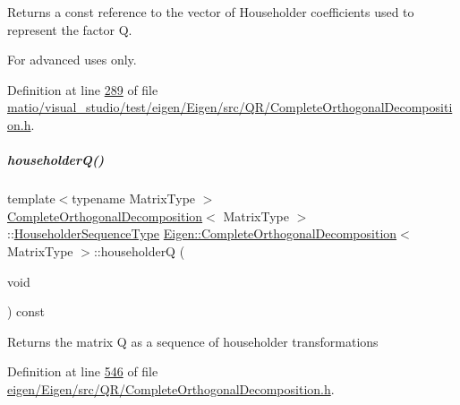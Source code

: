 \begin{DoxyReturn}{Returns}
a const reference to the vector of Householder coefficients used to represent the factor {\ttfamily Q}.
\end{DoxyReturn}
For advanced uses only. 

Definition at line \hyperlink{matio_2visual__studio_2test_2eigen_2_eigen_2src_2_q_r_2_complete_orthogonal_decomposition_8h_source_l00289}{289} of file \hyperlink{matio_2visual__studio_2test_2eigen_2_eigen_2src_2_q_r_2_complete_orthogonal_decomposition_8h_source}{matio/visual\+\_\+studio/test/eigen/\+Eigen/src/\+Q\+R/\+Complete\+Orthogonal\+Decomposition.\+h}.

\mbox{\label{group___q_r___module_ac95b93ddad59c6e57d06fcd4737b27e1}} 
\subparagraph{\texorpdfstring{householder\+Q()}{householderQ()}}
{\footnotesize\ttfamily template$<$typename Matrix\+Type $>$ \\
\hyperlink{group___q_r___module_class_eigen_1_1_complete_orthogonal_decomposition}{Complete\+Orthogonal\+Decomposition}$<$ Matrix\+Type $>$\+::\hyperlink{group___householder___module_class_eigen_1_1_householder_sequence}{Householder\+Sequence\+Type} \hyperlink{group___q_r___module_class_eigen_1_1_complete_orthogonal_decomposition}{Eigen\+::\+Complete\+Orthogonal\+Decomposition}$<$ Matrix\+Type $>$\+::householderQ (\begin{DoxyParamCaption}\item[{void}]{ }\end{DoxyParamCaption}) const}

\begin{DoxyReturn}{Returns}
the matrix Q as a sequence of householder transformations 
\end{DoxyReturn}


Definition at line \hyperlink{eigen_2_eigen_2src_2_q_r_2_complete_orthogonal_decomposition_8h_source_l00546}{546} of file \hyperlink{eigen_2_eigen_2src_2_q_r_2_complete_orthogonal_decomposition_8h_source}{eigen/\+Eigen/src/\+Q\+R/\+Complete\+Orthogonal\+Decomposition.\+h}.

